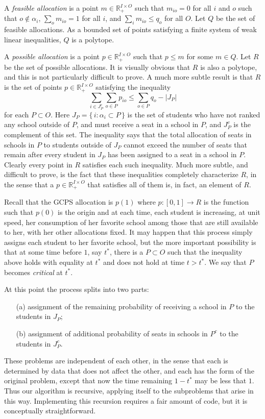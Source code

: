 \documentclass[12pt]{article}
\theoremstyle{definition}
\renewcommand{\Re}{\mathbb{R}}
\begin{document}
\begin{appendix}
A \emph{feasible allocation} is a point $m \in \Re^{I \times O}_+$
such that $m_{io} = 0$ for all $i$ and $o$ such that $o \notin
\alpha_i$, $\sum_o m_{io} = 1$ for all $i$, and $\sum_i m_{io} \le
q_o$ for all $O$.  Let $Q$ be the set of feasible allocations.  As a
bounded set of points satisfying a finite system of weak linear
inequalities, $Q$ is a polytope.

A \emph{possible allocation} is a point $p \in \Re^{I \times O}_+$
such that $p \le m$ for some $m \in Q$.  Let $R$ be the set of
possible allocations.  It is visually obvious that $R$ is also a
polytope, and this is not particularly difficult to prove.  A much
more subtle result is that $R$ is the set of points $p \in \Re^{I
  \times O}_+$ satisfying the inequality
$$\sum_{i \in J_P^c}\sum_{o \in P} p_{io} \le \sum_{o \in P} q_o -
|J_P|$$ for each $P \subset O$.  Here $J_P = \{\, i : \alpha_i \subset
P \,\}$ is the set of students who have not ranked any school outside
of $P$, and must receive a seat in a school in $P$, and $J_P^c$ is the
complement of this set.  The inequality says that the total allocation
of seats in schools in $P$ to students outside of $J_P$ cannot exceed
the number of seats that remain after every student in $J_P$ has been
assigned to a seat in a school in $P$.  Clearly every point in $R$
satisfies each such inequality.  Much more subtle, and difficult to
prove, is the fact that these inequalities completely characterize
$R$, in the sense that a $p \in \Re^{I \times O}_+$ that satisfies all
of them is, in fact, an element of $R$.

Recall that the GCPS allocation is $p(1)$ where $p \colon [0,1] \to R$
is the function such that $p(0)$ is the origin and at each time, each
student is increasing, at unit speed, her consumption of her favorite
school among those that are still available to her, with her other
allocations fixed.  It may happen that this process simply assigns
each student to her favorite school, but the more important
possibility is that at some time before $1$, say $t^*$, there is a $P
\subset O$ such that the inequality above holds with equality at $t^*$
and does not hold at time $t > t^*$.  We say that $P$ becomes
\emph{critical} at $t^*$.

At this point the process splits into two parts:
\begin{enumerate}
  \item[(a)] assignment of the remaining probability of receiving a
    school in $P$ to the students in $J_P$;
  \item[(b)] assignment of additional probability of seats in schools
    in $P^c$ to the students in $J_P^c$.
\end{enumerate}
These problems are independent of each other, in the sense that each
is determined by data that does not affect the other, and each has the
form of the original problem, except that now the time remaining $1 -
t^*$ may be less that $1$.  Thus our algorithm is recursive, applying
itself to the subproblems that arise in this way.  Implementing this
recursion requires a fair amount of code, but it is conceptually
straightforward.


\end{appendix}
\end{document}
